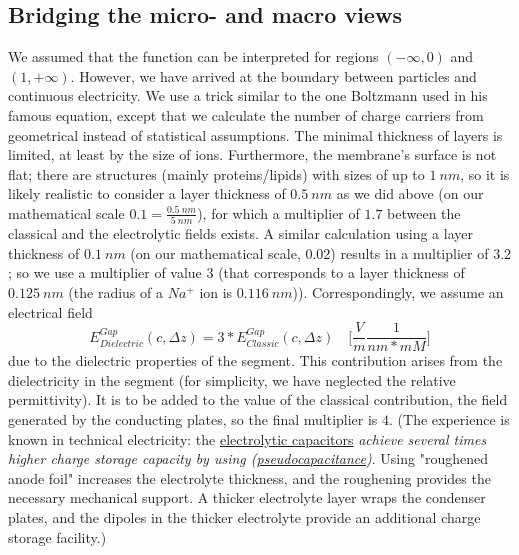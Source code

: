 \ifx\magyar\undefined

\subsection{Bridging the micro- and macro views\label{sec:Physics-BridgingElectricity}}
We assumed that the function can be interpreted for regions
$(-\infty,0)$ and $(1,+\infty)$. However, we have arrived at the boundary between particles and continuous electricity.
We use a trick similar to the one Boltzmann used in his famous equation, except that we calculate the number of charge carriers from
geometrical instead of statistical assumptions.
The minimal thickness of layers is limited, at least by the size of ions.  Furthermore, the membrane's surface is not flat; there are structures (mainly proteins/lipids) with sizes of up to $1~nm$, so it is likely 
realistic to consider a layer thickness of $0.5~nm$ as we did above
(on our mathematical scale $0.1=\frac{0.5~nm}{5~nm}$), for which a multiplier of $1.7$ between the classical and the electrolytic fields exists.
A similar calculation using a layer thickness of $0.1~nm$ (on our mathematical scale, 0.02) results in a multiplier of $3.2$;
so we use a multiplier of value 3 (that corresponds to a layer thickness of $0.125~nm$ (the radius of a $Na^+$ ion is $0.116~nm$)).
Correspondingly, we assume an electrical field 
\begin{equation}
	E^{Gap}_{Dielectric}(c,\Delta z) = 3*E^{Gap}_{Classic}(c,\Delta z)  \quad 
	\biggl[ \frac{V}{m} \frac{1}{nm*mM} \biggr]
\end{equation}
\noindent
due to the dielectric properties of the segment.
This contribution arises from the dielectricity in the segment (for simplicity, we have neglected the relative permittivity). It is to be added to the value of the 
classical contribution, the 
field generated by the conducting plates, so the 
final multiplier is $4$. 
(The experience
is known in technical electricity: the \href{https://en.wikipedia.org/wiki/Electrolytic_capacitor}{electrolytic capacitors}
\textit{achieve several times higher charge storage capacity by using (\href{https://en.wikipedia.org/wiki/Pseudocapacitance}
	{pseudocapacitance})}.
Using "roughened anode foil" increases the electrolyte thickness, and the roughening provides the necessary mechanical support. 
A thicker electrolyte layer wraps the condenser plates, and the dipoles in the thicker electrolyte provide an additional charge storage facility.)
\else

\fi

